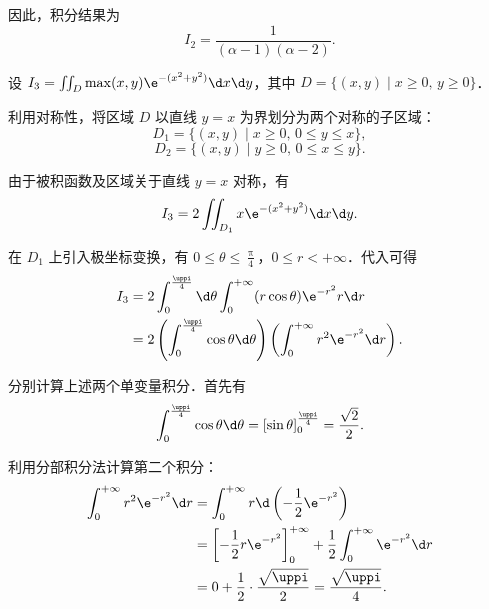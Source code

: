 \begin{solution}
    因此，积分结果为
    \begin{equation}
        I_2 = \boxed{\frac{1}{(\alpha - 1)(\alpha - 2)}}.
    \end{equation}


    设 $I_3 = \iint_D \max(x, y) \e^{-(x^2 + y^2)} \d x \d y$，其中 $D = \{ (x, y) \mid x \geqslant 0,\, y \geqslant 0 \}$．

    利用对称性，将区域 $D$ 以直线 $y = x$ 为界划分为两个对称的子区域：
    \begin{equation}
        D_1 = \{ (x, y) \mid x \geqslant 0,\, 0 \leqslant y \leqslant x \},
    \end{equation}
    \begin{equation}
        D_2 = \{ (x, y) \mid y \geqslant 0,\, 0 \leqslant x \leqslant y \}.
    \end{equation}

    由于被积函数及区域关于直线 $y = x$ 对称，有
    \begin{equation}
        I_3 = 2 \iint_{D_1} x \e^{-(x^2 + y^2)} \d x \d y.
    \end{equation}

    在 $D_1$ 上引入极坐标变换，有 $0 \leqslant \theta \leqslant \frac{\uppi}{4}$，$0 \leqslant r < +\infty$．代入可得
    \begin{equation}
        \begin{aligned}
            I_3 & = 2 \int_0^{\frac{\uppi}{4}} \d \theta \int_0^{+\infty} (r \cos \theta) \e^{-r^2} r \d r                              \\
                & = 2 \left( \int_0^{\frac{\uppi}{4}} \cos \theta \d \theta \right) \left( \int_0^{+\infty} r^2 \e^{-r^2} \d r \right).
        \end{aligned}
    \end{equation}

    分别计算上述两个单变量积分．首先有
    \begin{equation}
        \int_0^{\frac{\uppi}{4}} \cos \theta \d \theta = \left[ \sin \theta \right]_0^{\frac{\uppi}{4}} = \frac{\sqrt{2}}{2}.
    \end{equation}

    利用分部积分法计算第二个积分：
    \begin{equation}
        \begin{aligned}
            \int_0^{+\infty} r^2 \e^{-r^2} \d r & = \int_0^{+\infty} r \d \left( -\frac{1}{2} \e^{-r^2} \right)                                       \\
                                                & = \left[ -\frac{1}{2} r \e^{-r^2} \right]_0^{+\infty} + \frac{1}{2} \int_0^{+\infty} \e^{-r^2} \d r \\
                                                & = 0 + \frac{1}{2} \cdot \frac{\sqrt{\uppi}}{2} = \frac{\sqrt{\uppi}}{4}.
        \end{aligned}
    \end{equation}


\end{solution}
